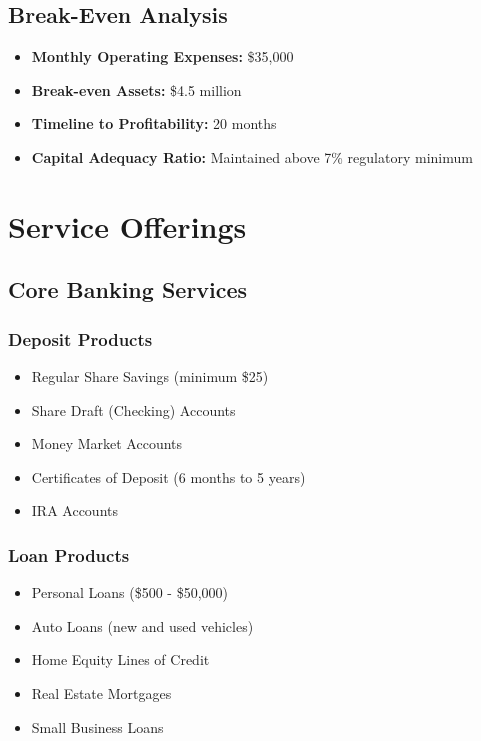 \documentclass[11pt,letterpaper]{article}
\begin{document}
\subsection{Break-Even Analysis}
\begin{itemize}[leftmargin=*]
    \item \textbf{Monthly Operating Expenses:} \$35,000
    \item \textbf{Break-even Assets:} \$4.5 million
    \item \textbf{Timeline to Profitability:} 20 months
    \item \textbf{Capital Adequacy Ratio:} Maintained above 7\% regulatory minimum
\end{itemize}

\section{Service Offerings}

\subsection{Core Banking Services}

\subsubsection{Deposit Products}
\begin{itemize}[leftmargin=*]
    \item Regular Share Savings (minimum \$25)
    \item Share Draft (Checking) Accounts
    \item Money Market Accounts
    \item Certificates of Deposit (6 months to 5 years)
    \item IRA Accounts
\end{itemize}

\subsubsection{Loan Products}
\begin{itemize}[leftmargin=*]
    \item Personal Loans (\$500 - \$50,000)
    \item Auto Loans (new and used vehicles)
    \item Home Equity Lines of Credit
    \item Real Estate Mortgages
    \item Small Business Loans
\end{itemize}
\end{document}
